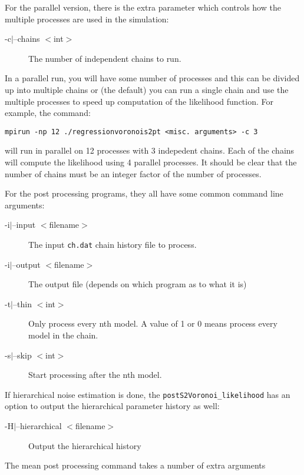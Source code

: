 \documentclass{article}
\begin{document}
For the parallel version, there is the extra parameter which controls how the multiple
processes are used in the simulation:

\begin{description}
\item [-c$|$--chains $<$int$>$] The number of independent chains to run.
\end{description}

In a parallel run, you will have some number of processes and this can be divided up
into multiple chains or (the default) you can run a single chain and use the
multiple processes to speed up computation of the likelihood function. For example,
the command:

\begin{verbatim}
mpirun -np 12 ./regressionvoronois2pt <misc. arguments> -c 3
\end{verbatim}

will run in parallel on 12 processes with 3 indepedent chains. Each of the chains
will compute the likelihood using 4 parallel processes. It should be clear that
the number of chains must be an integer factor of the number of processes.

For the post processing programs, they all have some common command line arguments:

\begin{description}
\item[-i$|$--input $<$filename$>$] The input {\tt ch.dat} chain history file to process.
\item[-i$|$--output $<$filename$>$] The output file (depends on which program as to what it is)
\item[-t$|$--thin $<$int$>$] Only process every nth model. A value of 1 or 0 means process every
  model in the chain.
\item[-s$|$--skip $<$int$>$] Start processing after the nth model.
\end{description}

If hierarchical noise estimation is done, the {\tt postS2Voronoi\_likelihood} has an option
to output the hierarchical parameter history as well:

\begin{description}
\item[-H$|$--hierarchical $<$filename$>$] Output the hierarchical history
\end{description}

The mean post processing command takes a number of extra arguments
\end{document}
